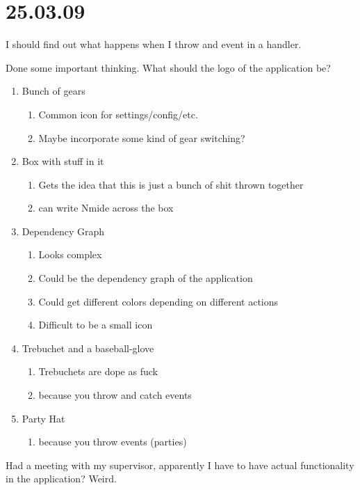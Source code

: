 \section{25.03.09}

I should find out what happens when I throw and event in a handler.

Done some important thinking. What should the logo of the application be?

\begin{enumerate}
  \item Bunch of gears
  \begin{enumerate}
    \item Common icon for settings/config/etc.
    \item Maybe incorporate some kind of gear switching?
  \end{enumerate}
  \item Box with stuff in it
  \begin{enumerate}
    \item Gets the idea that this is just a bunch of shit thrown together
    \item can write Nmide across the box
  \end{enumerate}
  \item Dependency Graph
  \begin{enumerate}
    \item Looks complex
    \item Could be the dependency graph of the application
    \item Could get different colors depending on different actions
    \item Difficult to be a small icon
  \end{enumerate}
  \item Trebuchet and a baseball-glove
  \begin{enumerate}
    \item Trebuchets are dope as fuck
    \item because you throw and catch events
  \end{enumerate}
  \item Party Hat
  \begin{enumerate}
    \item because you throw events (parties)
  \end{enumerate}
\end{enumerate}

Had a meeting with my supervisor, apparently I have to have actual functionality
in the application? Weird.

